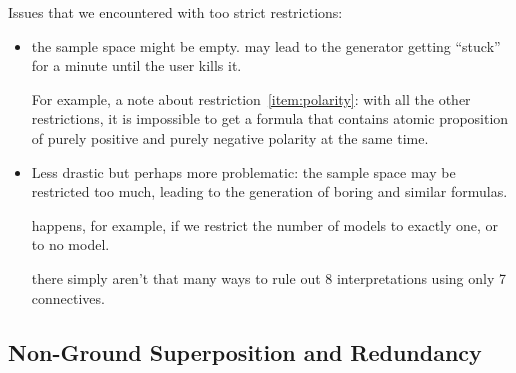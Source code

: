 Issues that we encountered with too strict restrictions:
\begin{itemize}
    \item
        the sample space might be empty.
        may lead to the generator getting ``stuck'' for a minute until the user kills it.

        For example, a note about restriction~\ref{item:polarity}:
        with all the other restrictions,
        it is impossible to get a formula that contains atomic proposition
        of purely positive and purely negative polarity at the same time.

    \item
        Less drastic but perhaps more problematic:
        the sample space may be restricted too much,
        leading to the generation of boring and similar formulas.

        happens, for example, if we restrict the number of models to exactly one,
        or to no model.

        there simply aren't that many ways to rule out 8 interpretations
        using only 7 connectives.
\end{itemize}






\subsection{Non-Ground Superposition and Redundancy}

